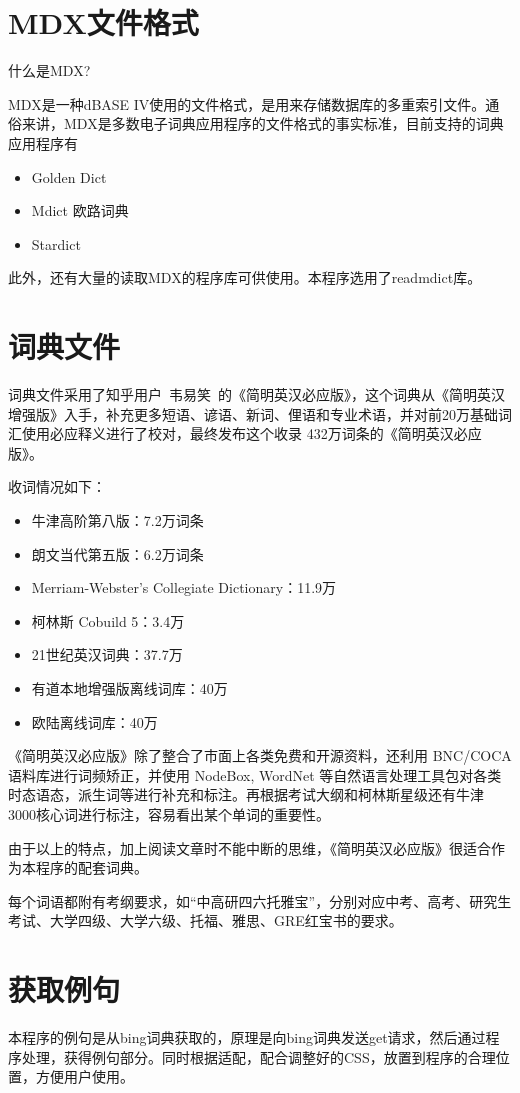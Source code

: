 \documentclass[a4paper, 11pt， oneside]{article}
\begin{document}
\section{MDX文件格式}
    什么是MDX?

    MDX是一种dBASE IV使用的文件格式，是用来存储数据库的多重索引文件。通俗来讲，MDX是多数电子词典应用程序的文件格式的事实标准，目前支持的词典应用程序有
    \begin{itemize}
        \item Golden Dict
        \item Mdict 欧路词典
        \item Stardict
    \end{itemize}
    此外，还有大量的读取MDX的程序库可供使用。本程序选用了readmdict库。
\section{词典文件}
    词典文件采用了知乎用户\ 韦易笑\ 的《简明英汉必应版》，这个词典从《简明英汉增强版》入手，补充更多短语、谚语、新词、俚语和专业术语，并对前20万基础词汇使用必应释义进行了校对，最终发布这个收录 432万词条的《简明英汉必应版》。

    收词情况如下：
    \begin{itemize}
        \item 牛津高阶第八版：7.2万词条
        \item 朗文当代第五版：6.2万词条
        \item Merriam-Webster's Collegiate Dictionary：11.9万
        \item 柯林斯 Cobuild 5：3.4万
        \item 21世纪英汉词典：37.7万
        \item 有道本地增强版离线词库：40万
        \item 欧陆离线词库：40万    
    \end{itemize}
    
    《简明英汉必应版》除了整合了市面上各类免费和开源资料，还利用 BNC/COCA 语料库进行词频矫正，并使用 NodeBox, WordNet 等自然语言处理工具包对各类时态语态，派生词等进行补充和标注。再根据考试大纲和柯林斯星级还有牛津 3000核心词进行标注，容易看出某个单词的重要性。

    由于以上的特点，加上阅读文章时不能中断的思维，《简明英汉必应版》很适合作为本程序的配套词典。

    每个词语都附有考纲要求，如“中高研四六托雅宝”，分别对应中考、高考、研究生考试、大学四级、大学六级、托福、雅思、GRE红宝书的要求。
\section{获取例句}
    本程序的例句是从bing词典获取的，原理是向bing词典发送get请求，然后通过程序处理，获得例句部分。同时根据适配，配合调整好的CSS，放置到程序的合理位置，方便用户使用。
\end{document}
